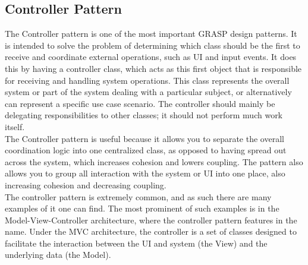 \documentclass{article}
\begin{document}
    \subsection{Controller Pattern}
    The Controller pattern is one of the most important GRASP design patterns.
    It is intended to solve the problem of determining which class should be the
    first to receive and coordinate external operations, such as UI and input
    events. It does this by having a controller class, which acts as this first
    object that is responsible for receiving and handling system operations.
    This class represents the overall system or part of the system dealing with
    a particular subject, or alternatively can represent a specific use case
    scenario. The controller should mainly be delegating responsibilities to
    other classes; it should not perform much work itself.\\
    The Controller pattern is useful because it allows you to separate the
    overall coordination logic into one centralized class, as opposed to having
    spread out across the system, which increases cohesion and lowers coupling.
    The pattern also allows you to group all interaction with the system or UI
    into one place, also increasing cohesion and decreasing coupling.\\
    The controller pattern is extremely common, and as such there are many
    examples of it one can find. The most prominent of such examples is in the
    Model-View-Controller architecture, where the controller pattern features in
    the name. Under the MVC architecture, the controller is a set of classes
    designed to facilitate the interaction between the UI and system (the View)
    and the underlying data (the Model).
    \newpage
\end{document}
